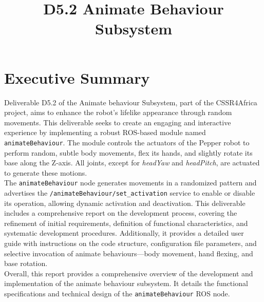\documentclass{CSSRforAfrica}
\begin{document}



\title{D5.2  Animate Behaviour Subsystem}               %

\partner{}                                      




\maketitle

\section*{Executive Summary}
Deliverable D5.2 of the Animate behaviour Subsystem, part of the CSSR4Africa project, aims to enhance the robot’s lifelike appearance through random movements. This deliverable seeks to create an engaging and interactive experience by implementing a robust ROS-based module named  \texttt{animateBehaviour}. The module controls the actuators of the Pepper robot to perform random, subtle body movements, flex its hands, and slightly rotate its base along the Z-axis. All joints, except for \textit{headYaw} and \textit{headPitch}, are actuated to generate these motions.\\[1em]
The \texttt{animateBehaviour} node generates movements in a randomized pattern and advertises the \texttt{/animateBehaviour/set\_activation} service to enable or disable its operation, allowing dynamic activation and deactivation. This deliverable includes a comprehensive report on the development process, covering the refinement of initial requirements, definition of functional characteristics, and systematic development procedures. Additionally, it provides a detailed user guide with instructions on the code structure, configuration file parameters, and selective invocation of animate behaviours—body movement, hand flexing, and base rotation.\\[1em]
Overall, this report provides a comprehensive overview of the development and implementation of the animate behaviour subsystem. It details the functional specifications and technical design of the \texttt{animateBehaviour} ROS node.
\end{document}
